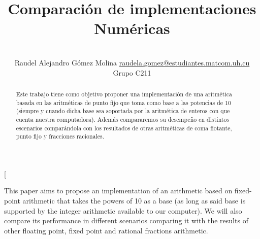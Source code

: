 \documentclass[a4paper,10pt,twocolumn]{article}
\title{Comparación de implementaciones Numéricas}
\author{\\
\name Raudel Alejandro Gómez Molina \email \href{mailto:raudela.gomez@estudiantes.matcom.uh.cu}{raudela.gomez@estudiantes.matcom.uh.cu}
	\\ \addr Grupo C211}
\begin{document}
\twocolumn[

\maketitle


\begin{abstract}

	Este trabajo tiene como objetivo proponer una implementación de una aritmética basada en las aritméticas de punto fijo que toma como base a las potencias de 10 (siempre y cuando dicha base sea soportada por la aritmética de enteros con que cuenta nuestra computadora). Además compararemos su desempeño en distintos escenarios comparándola con los resultados de otras aritméticas de coma flotante, punto fijo y fracciones racionales.
	
\end{abstract}

\vspace{0.5cm}

\begin{enabstract}

	This paper aims to propose an implementation of an arithmetic based on fixed-point arithmetic that takes the powers of 10 as a base (as long as said base is supported by the integer arithmetic available to our computer). We will also compare its performance in different scenarios comparing it with the results of other floating point, fixed point and rational fractions arithmetic.

\end{enabstract}
\end{document}
